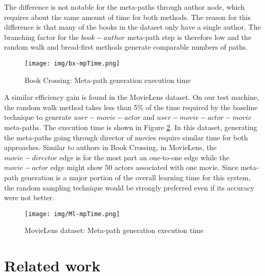 \documentclass {acmart}
\begin{document}
The difference is not notable for the meta-paths through author node, which requires about the same amount of time for both methods. The reason for this difference is that many of the books in the dataset only have a single author. The branching factor for the $book-author$ meta-path step is therefore low and the random walk and bread-first methods generate comparable numbers of paths.   


\begin{figure}[tbh]
	\centering
	\texttt{[image: img/bx-mpTime.png]}
	\caption{\label{fig:bx-tm} Book Crossing: Meta-path generation execution time}
\end{figure}

A similar efficiency gain is found in the MovieLens dataset. On our test machine, the random walk method takes less than 5\% of the time required by the baseline technique to generate $user-movie-actor$ and $user-movie-actor-movie$ meta-paths. The execution time is shown in Figure \ref{fig:ml-tm}. In this dataset, generating the meta-paths going through  director of movies require similar time for both approaches. Similar to authors in Book Crossing, in MovieLens, the $movie-director$ edge is for the most part an one-to-one edge while the $movie-actor$ edge might show 50 actors associated with one movie. Since meta-path generation is a major portion of the overall learning time for this system, the random sampling technique would be strongly preferred even if its accuracy were not better.


\begin{figure}[tbh]
	\centering
	\texttt{[image: img/Ml-mpTime.png]}
	\caption{\label{fig:ml-tm} MovieLens dataset: Meta-path generation execution time}
\end{figure}	

 
\section{Related work}
 
\end{document}
